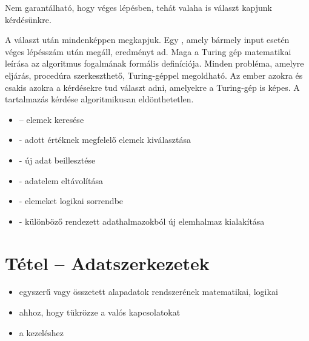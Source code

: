 \documentclass[main.tex]{subfiles}
\begin{document}
  Nem garantálható, hogy véges lépésben,
  tehát valaha is választ kapjunk kérdésünkre.


  A választ  után mindenképpen megkapjuk.
  Egy , amely bármely input esetén
  véges lépésszám után megáll, eredményt ad.
  Maga a Turing gép matematikai leírása az algoritmus
  fogalmának formális definíciója.
  Minden probléma, amelyre eljárás,
  procedúra szerkeszthető, Turing-géppel megoldható.
  Az ember azokra és csakis azokra a kérdésekre tud választ adni,
  amelyekre a Turing-gép is képes.
  A tartalmazás kérdése algoritmikusan eldönthetetlen.
  \begin{itemize}
    \item {} – elemek keresése
    
    \item {} - adott értéknek megfelelő elemek kiválasztása
    
    \item {} - új adat beillesztése
    
    \item {} - adatelem eltávolítása
    
    \item {} - elemeket logikai sorrendbe
    
    \item {} - különböző rendezett
    adathalmazokból új elemhalmaz kialakítása
  \end{itemize}


  \section{Tétel – Adatszerkezetek} %
  \begin{itemize}
    \item egyszerű vagy összetett alapadatok
    rendszerének matematikai, logikai 

    \item {} ahhoz, hogy tükrözze a valós kapcsolatokat
    
    \item {} a kezeléshez
  \end{itemize}
\end{document}
